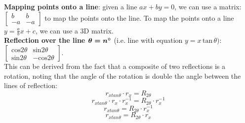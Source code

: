 \documentclass[12pt, letterpaper]{article}
\begin{document}
\textbf{Mapping points onto a line}: given a line \(ax+by=0\), we can use a matrix: \(
\begin{bmatrix} 
b & b \\ 
-a & -a 
\end{bmatrix}\) to map the points onto the line. To map the points onto a line \(y=\frac{a}{b}x+c\), we can use a 3D matrix.
\vspace{1em}\\

\textbf{Reflection over the line \(\boldsymbol{\theta=n\degree}\)} (i.e. line with equation \(y=x\,\text{tan}\,\theta)\): \(
\begin{bmatrix} 
\text{cos}2\theta & \text{sin}2\theta \\ 
\text{sin}2\theta & -\text{cos}2\theta 
\end{bmatrix}\).
\vspace{1em}\\
This can be derived from the fact that a composite of two reflections is a rotation, noting that the angle of the rotation is double the angle between the lines of reflection: \[r_{xtan\theta}\cdot r_x=R_{2\theta}\] \[r_{xtan\theta}\cdot r_x\cdot r_x^{-1}=R_{2\theta}\cdot r_x^{-1}\] \[r_{xtan\theta}=R_{2\theta}\cdot r_x^{-1}\] \[r_{xtan\theta}=R_{2\theta}\cdot r_x\]
\end{document}
